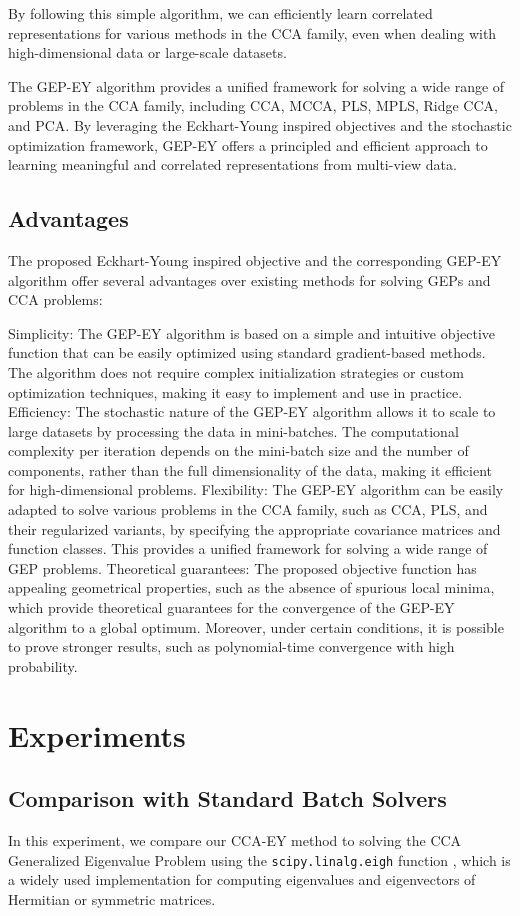By following this simple algorithm, we can efficiently learn correlated representations for various methods in the CCA family, even when dealing with high-dimensional data or large-scale datasets.

The GEP-EY algorithm provides a unified framework for solving a wide range of problems in the CCA family, including CCA, MCCA, PLS, MPLS, Ridge CCA, and PCA. By leveraging the Eckhart-Young inspired objectives and the stochastic optimization framework, GEP-EY offers a principled and efficient approach to learning meaningful and correlated representations from multi-view data.

\subsection{Advantages}
The proposed Eckhart-Young inspired objective and the corresponding GEP-EY algorithm offer several advantages over existing methods for solving GEPs and CCA problems:

Simplicity: The GEP-EY algorithm is based on a simple and intuitive objective function that can be easily optimized using standard gradient-based methods. The algorithm does not require complex initialization strategies or custom optimization techniques, making it easy to implement and use in practice.
Efficiency: The stochastic nature of the GEP-EY algorithm allows it to scale to large datasets by processing the data in mini-batches. The computational complexity per iteration depends on the mini-batch size and the number of components, rather than the full dimensionality of the data, making it efficient for high-dimensional problems.
Flexibility: The GEP-EY algorithm can be easily adapted to solve various problems in the CCA family, such as CCA, PLS, and their regularized variants, by specifying the appropriate covariance matrices and function classes. This provides a unified framework for solving a wide range of GEP problems.
Theoretical guarantees: The proposed objective function has appealing geometrical properties, such as the absence of spurious local minima, which provide theoretical guarantees for the convergence of the GEP-EY algorithm to a global optimum. Moreover, under certain conditions, it is possible to prove stronger results, such as polynomial-time convergence with high probability.

\section{Experiments}
\subsection{Comparison with Standard Batch Solvers}
In this experiment, we compare our CCA-EY method to solving the CCA Generalized Eigenvalue Problem using the \texttt{scipy.linalg.eigh} function \citep{virtanen2020scipy}, which is a widely used implementation for computing eigenvalues and eigenvectors of Hermitian or symmetric matrices.
